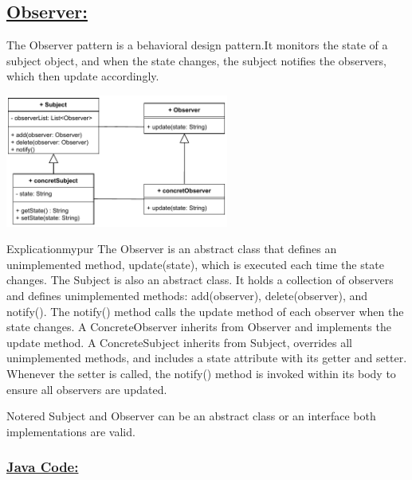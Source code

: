 \vspace{0.5cm}

\subsection*{\underline{Observer:}}
The Observer pattern is a behavioral design pattern.It monitors
the state of a subject object, and when the state changes, the subject 
notifies the observers, which then update accordingly.

\vspace{0.25cm}
\begin{center}
\includegraphics[width=0.55\textwidth,height=0.35\textheight]{Chapters/DesignPattern/Observer/obs1.drawio.pdf}
\end{center}

\vspace{0.25cm}
\begin{prettyBox}{Explication}{mypur}
The Observer is an abstract class that defines an unimplemented method, update(state), which is executed each time the state changes.  
The Subject is also an abstract class. It holds a collection of observers and defines unimplemented methods: add(observer), delete(observer), and notify(). The notify() 
method calls the update method of each observer when the state changes.  
A ConcreteObserver inherits from Observer and implements the update method.  
A ConcreteSubject inherits from Subject, overrides all unimplemented methods, and includes a state attribute with its getter and setter.  
Whenever the setter is called, the notify() method is invoked within its body to ensure all observers are updated.
\end{prettyBox}

\vspace{0.25cm}
\begin{prettyBox}{Note}{red}
Subject and Observer can be an abstract class or an interface both implementations are valid.
\end{prettyBox}

\newpage
\subsubsection*{\underline{Java Code:}}

